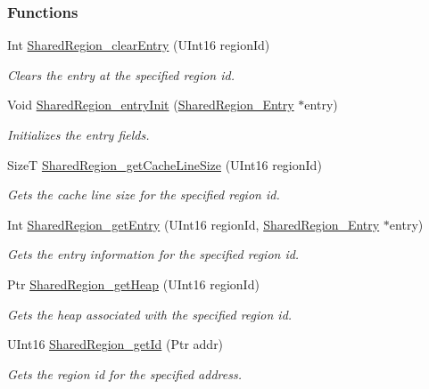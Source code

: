 \subsubsection*{Functions}
\begin{DoxyCompactItemize}
\item 
Int \hyperlink{_shared_region_8h_ae8654bccc1c7acbe7814ecc05ddee6e0}{Shared\-Region\-\_\-clear\-Entry} (U\-Int16 region\-Id)
\begin{DoxyCompactList}\small\item\em Clears the entry at the specified region id. \end{DoxyCompactList}\item 
Void \hyperlink{_shared_region_8h_a8462f38d89bbf6d9f0974c2465606110}{Shared\-Region\-\_\-entry\-Init} (\hyperlink{struct_shared_region___entry}{Shared\-Region\-\_\-\-Entry} $\ast$entry)
\begin{DoxyCompactList}\small\item\em Initializes the entry fields. \end{DoxyCompactList}\item 
Size\-T \hyperlink{_shared_region_8h_ae673e2d9bfd20a7eb07bcaab9a3c70aa}{Shared\-Region\-\_\-get\-Cache\-Line\-Size} (U\-Int16 region\-Id)
\begin{DoxyCompactList}\small\item\em Gets the cache line size for the specified region id. \end{DoxyCompactList}\item 
Int \hyperlink{_shared_region_8h_aa7838cd5e41f00af54e2a76c3f251eca}{Shared\-Region\-\_\-get\-Entry} (U\-Int16 region\-Id, \hyperlink{struct_shared_region___entry}{Shared\-Region\-\_\-\-Entry} $\ast$entry)
\begin{DoxyCompactList}\small\item\em Gets the entry information for the specified region id. \end{DoxyCompactList}\item 
Ptr \hyperlink{_shared_region_8h_a6cbed730e029bb68e4c163b34ed69fa3}{Shared\-Region\-\_\-get\-Heap} (U\-Int16 region\-Id)
\begin{DoxyCompactList}\small\item\em Gets the heap associated with the specified region id. \end{DoxyCompactList}\item 
U\-Int16 \hyperlink{_shared_region_8h_afc6f82dd851547d6d6221a779be945dd}{Shared\-Region\-\_\-get\-Id} (Ptr addr)
\begin{DoxyCompactList}\small\item\em Gets the region id for the specified address. \end{DoxyCompactList}\item 

\end{DoxyCompactItemize}
